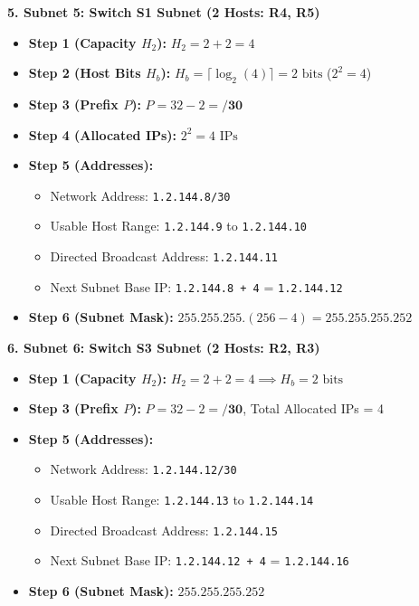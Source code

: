\documentclass[11pt,a4paper]{article}
\begin{document}
\textbf{5. Subnet 5: Switch S1 Subnet (2 Hosts: R4, R5)}
\begin{itemize}
    \item \textbf{Step 1 (Capacity $H_2$):} $H_2 = 2 + 2 = 4$
    \item \textbf{Step 2 (Host Bits $H_b$):} $H_b = \lceil \log_2(4) \rceil = 2\text{ bits}$ ($2^2 = 4$)
    \item \textbf{Step 3 (Prefix $P$):} $P = 32 - 2 = \mathbf{/30}$
    \item \textbf{Step 4 (Allocated IPs):} $2^2 = 4\text{ IPs}$
    \item \textbf{Step 5 (Addresses):}
    \begin{itemize}
        \item Network Address: \texttt{1.2.144.8/30}
        \item Usable Host Range: \texttt{1.2.144.9} to \texttt{1.2.144.10}
        \item Directed Broadcast Address: \texttt{1.2.144.11}
        \item Next Subnet Base IP: \texttt{1.2.144.8 + 4} = \texttt{1.2.144.12}
    \end{itemize}
    \item \textbf{Step 6 (Subnet Mask):} $255.255.255.(256 - 4) = \mathbf{255.255.255.252}$
\end{itemize}

\textbf{6. Subnet 6: Switch S3 Subnet (2 Hosts: R2, R3)}
\begin{itemize}
    \item \textbf{Step 1 (Capacity $H_2$):} $H_2 = 2 + 2 = 4 \implies H_b = 2\text{ bits}$
    \item \textbf{Step 3 (Prefix $P$):} $P = 32 - 2 = \mathbf{/30}$, Total Allocated IPs = 4
    \item \textbf{Step 5 (Addresses):}
    \begin{itemize}
        \item Network Address: \texttt{1.2.144.12/30}
        \item Usable Host Range: \texttt{1.2.144.13} to \texttt{1.2.144.14}
        \item Directed Broadcast Address: \texttt{1.2.144.15}
        \item Next Subnet Base IP: \texttt{1.2.144.12 + 4} = \texttt{1.2.144.16}
    \end{itemize}
    \item \textbf{Step 6 (Subnet Mask):} $\mathbf{255.255.255.252}$
\end{itemize}
\end{document}
